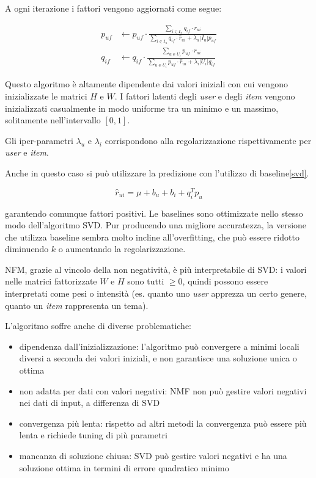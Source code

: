 A ogni iterazione i fattori vengono aggiornati come segue:

\begin{equation}
    \begin{split}
        p_{uf} &\leftarrow p_{uf} \cdot \frac{\sum\limits_{i \in I_u} q_{if} \cdot r_{ui}}{\sum\limits_{i \in I_u} q_{if} \cdot \hat{r}_{ui} + \lambda_u |I_u| p_{uf}}\\
        q_{if} &\leftarrow q_{if} \cdot \frac{\sum\limits_{u \in U_i} p_{uf} \cdot r_{ui}}{\sum\limits_{u \in U_i} p_{uf} \cdot \hat{r}_{ui} + \lambda_i |U_i| q_{if}}
    \end{split}
\end{equation}

Questo algoritmo è altamente dipendente dai valori iniziali con cui vengono inizializzate le matrici $H$ e $W$. I fattori latenti degli \textit{user} e degli \textit{item} vengono inizializzati casualmente in modo uniforme tra un minimo e un massimo, solitamente nell'intervallo $[0, 1]$.

Gli iper-parametri $\lambda_u$ e $\lambda_i$ corrispondono alla regolarizzazione rispettivamente per \textit{user} e \textit{item}.

Anche in questo caso si può utilizzare la predizione con l'utilizzo di baseline\ref{svd}.

\[
\hat{r}_{ui} = \mu + b_u + b_i + q_i^T p_u
\]

garantendo comunque fattori positivi. Le baselines sono ottimizzate nello stesso modo dell'algoritmo SVD. Pur producendo una migliore accuratezza, la versione che utilizza baseline sembra molto incline all'overfitting, che può essere ridotto diminuendo $k$ o aumentando la regolarizzazione.

NFM, grazie al vincolo della non negatività, è più interpretabile di SVD: i valori nelle matrici fattorizzate $W$ e $H$ sono tutti $\geq 0$, quindi possono essere interpretati come pesi o intensità (es. quanto uno \textit{user} apprezza un certo genere, quanto un \textit{item} rappresenta un tema).

L'algoritmo soffre anche di diverse problematiche:

\begin{itemize}
    \item dipendenza dall'inizializzazione: l'algoritmo può convergere a minimi locali diversi a seconda dei valori iniziali, e non garantisce una soluzione unica o ottima
    
    \item non adatta per dati con valori negativi: NMF non può gestire valori negativi nei dati di input, a differenza di SVD
    
    \item convergenza più lenta: rispetto ad altri metodi la convergenza può essere più lenta e richiede tuning di più parametri
    \item mancanza di soluzione chiusa: SVD può gestire valori negativi e ha una soluzione ottima in termini di errore quadratico minimo
\end{itemize}


